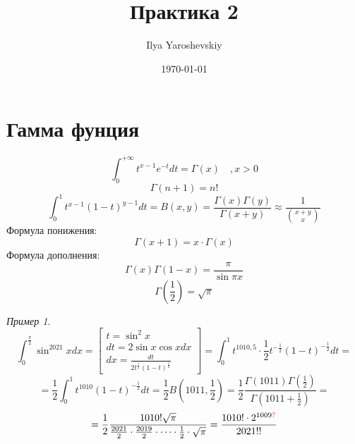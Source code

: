 \documentclass[english]{article}
\author{Ilya Yaroshevskiy}
\date{\today}
\title{Практика 2}
\theoremstyle{plain}
\theoremstyle{remark}
\newtheorem*{examp}{Пример}
\theoremstyle{definition}
\begin{document}
\maketitle
\tableofcontents


\section{Гамма фунция}
\label{sec:org79f6d3c}
\[ \int_0^{ + \infty} t^{x - 1}e^{-t}dt = \Gamma(x)\quad, x > 0 \]
\[ \Gamma(n + 1) = n! \]
\[ \int_0^1 t^{x - 1}(1 - t)^{y - 1}dt = B(x, y) = \frac{\Gamma(x)\Gamma(y)}{\Gamma(x + y)} \approx \frac{1}{\binom{x + y}{x}} \]
Формула понижения: \[ \Gamma(x + 1) = x\cdot\Gamma(x) \]
Формула дополнения: \[ \Gamma(x)\Gamma(1-x) = \frac{\pi}{\sin \pi x} \]
\[ \Gamma(\frac{1}{2}) = \sqrt{\pi} \]

\begin{examp}
\[ \int_0^{\frac{\pi}{2}}\sin^{2021}x dx = \left[\begin{array}{l} t = \sin^2 x \\ dt = 2\sin x\cos x dx \\ dx = \frac{dt}{2t^{\frac{1}{2}}(1 - t)^{\frac{1}{2}}}\end{array}\right]  = \int_0^1 t^{1010,5}\cdot\frac{1}{2}t^{-\frac{1}{2}}(1 - t)^{-\frac{1}{2}}dt = \]
\[ = \frac{1}{2} \int_0^1 t^{1010}(1 - t)^{-\frac{1}{2}} dt = \frac{1}{2}B(1011, \frac{1}{2}) = \frac{1}{2}\frac{\Gamma(1011)\Gamma(\frac{1}{2})}{\Gamma(1011 + \frac{1}{2})} = \]
\[ = \frac{1}{2}\frac{1010!\sqrt{\pi}}{\frac{2021}{2}\cdot\frac{2019}{2}\cdot\dots\cdot\frac{1}{2}\cdot\sqrt{\pi}} = \frac{1010!\cdot2^{1009\color{red}?\color{black}}}{2021!!}\]
\end{examp}
\end{document}

